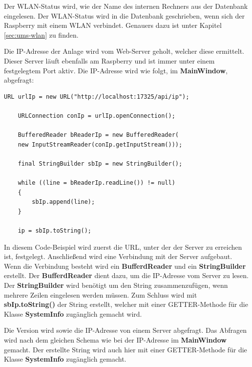 Der WLAN-Status wird, wie der Name des internen Rechners aus der Datenbank eingelesen. Der WLAN-Status wird in die Datenbank geschrieben, wenn sich der Raspberry mit einem WLAN verbindet. Genauers dazu ist unter Kapitel \ref{sec:ums-wlan} zu finden.

\vspace{10pt}

Die IP-Adresse der Anlage wird vom Web-Server geholt, welcher diese ermittelt. Dieser Server läuft ebenfalls am Raspberry und ist immer unter einem festgelegtem Port aktiv. Die \ac{IP}-Adresse wird wie folgt, im \textbf{MainWindow}, abgefragt:
\begin{lstlisting}[style=JavaStyle, caption=Abfragen der \ac{IP}-Adresse]
	URL urlIp = new URL("http://localhost:17325/api/ip");
	
	URLConnection conIp = urlIp.openConnection();
	
	BufferedReader bReaderIp = new BufferedReader(
	new InputStreamReader(conIp.getInputStream()));    
	
	final StringBuilder sbIp = new StringBuilder();
	
	while ((line = bReaderIp.readLine()) != null)
	{
		sbIp.append(line);
	}
            
	ip = sbIp.toString();    
\end{lstlisting}
In diesem Code-Beispiel wird zuerst die \ac{URL}, unter der der Server zu erreichen ist, festgelegt. Anschließend wird eine Verbindung mit der Server aufgebaut. Wenn die Verbindung besteht wird ein \textbf{BufferdReader} und ein \textbf{StringBuilder} erstellt. Der \textbf{BufferdReader} dient dazu, um die \ac{IP}-Adresse vom Server zu lesen. Der \textbf{StringBuilder} wird benötigt um den String zusammenzufügen, wenn mehrere Zeilen eingelesen werden müssen. Zum Schluss wird mit \textbf{sbIp.toString()} der String erstellt, welcher mit einer GETTER-Methode für die Klasse \textbf{SystemInfo} zugänglich gemacht wird.

\vspace{10pt}

Die Version wird sowie die \ac{IP}-Adresse von einem Server abgefragt. Das Abfragen wird nach dem gleichen Schema wie bei der \ac{IP}-Adresse im \textbf{MainWindow} gemacht. Der erstellte String wird auch hier mit einer GETTER-Methode für die Klasse \textbf{SystemInfo} zugänglich gemacht.


\newpage

